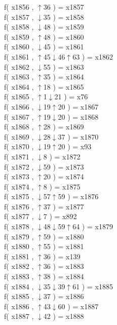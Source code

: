 f( x1856 , $\uparrow$36 ) = x1857 \\
f( x1857 , $\downarrow$35 ) = x1858 \\
f( x1858 , $\downarrow$48 ) = x1859 \\
f( x1859 , $\uparrow$48 ) = x1860 \\
f( x1860 , $\downarrow$45 ) = x1861 \\
f( x1861 , $\uparrow$45$\downarrow$46$\uparrow$63 ) = x1862 \\
f( x1862 , $\downarrow$55 ) = x1863 \\
f( x1863 , $\uparrow$35 ) = x1864 \\
f( x1864 , $\uparrow$18 ) = x1865 \\
f( x1865 , $\uparrow$1$\downarrow$21 ) = x76 \\
f( x1866 , $\downarrow$19$\uparrow$20 ) = x1867 \\
f( x1867 , $\uparrow$19$\downarrow$20 ) = x1868 \\
f( x1868 , $\uparrow$28 ) = x1869 \\
f( x1869 , $\downarrow$28$\downarrow$37 ) = x1870 \\
f( x1870 , $\downarrow$19$\uparrow$20 ) = x93 \\
f( x1871 , $\downarrow$8 ) = x1872 \\
f( x1872 , $\downarrow$59 ) = x1873 \\
f( x1873 , $\uparrow$20 ) = x1874 \\
f( x1874 , $\uparrow$8 ) = x1875 \\
f( x1875 , $\downarrow$57$\uparrow$59 ) = x1876 \\
f( x1876 , $\uparrow$37 ) = x1877 \\
f( x1877 , $\downarrow$7 ) = x892 \\
f( x1878 , $\downarrow$48$\downarrow$59$\uparrow$64 ) = x1879 \\
f( x1879 , $\uparrow$59 ) = x1880 \\
f( x1880 , $\uparrow$55 ) = x1881 \\
f( x1881 , $\uparrow$36 ) = x139 \\
f( x1882 , $\uparrow$36 ) = x1883 \\
f( x1883 , $\uparrow$38 ) = x1884 \\
f( x1884 , $\downarrow$35$\downarrow$39$\uparrow$61 ) = x1885 \\
f( x1885 , $\downarrow$37 ) = x1886 \\
f( x1886 , $\uparrow$43$\downarrow$60 ) = x1887 \\
f( x1887 , $\downarrow$42 ) = x1888 \\
